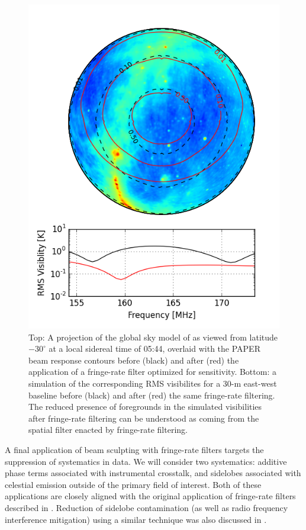 \documentclass[twocolumn,apj,numberedappendix]{emulateapj}
\begin{document}
\begin{figure}\centering
\includegraphics[width=.9\columnwidth]{plots/gsm.png}
\caption{
Top: A projection of the global sky model of \citet{deoliveiracosta_et_al2008} as viewed from
latitude $-30^\circ$ at a local sidereal time of 05:44, overlaid with the 
PAPER beam response contours before (black) and after (red) the application of a fringe-rate filter
optimized for sensitivity.  
Bottom: a simulation of the corresponding RMS visibilites for a 30-m east-west baseline before (black) and
after (red) the same fringe-rate filtering.
The reduced presence of foregrounds in the simulated visibilities after fringe-rate filtering
can be understood as coming from the spatial filter enacted by fringe-rate filtering.
}\label{fig:gsm}
\end{figure}


A final application of beam sculpting with fringe-rate filters targets the suppression of systematics in data.
We will consider two systematics: additive phase terms associated with instrumental crosstalk, and sidelobes
associated with celestial emission outside of the primary field of interest.  Both of these applications are 
closely aligned with the original application of fringe-rate filters described in \citet{parsons_backer2009}. Reduction of sidelobe contamination (as well as radio frequency
interference mitigation) using a similar technique was also discussed in \citet{offringa_et_al2012}.
\end{document}
